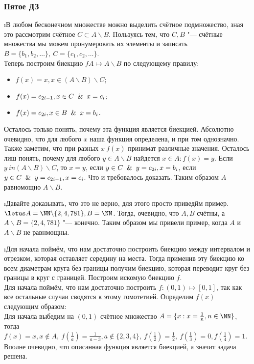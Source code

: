 \subsubsection{Пятое ДЗ}


\i В любом бесконечном множестве можно выделить счётное подмножество, зная это рассмотрим счётное $C \subset A \backslash B$. Пользуясь тем, что $C, B$ "--- счётные множества мы можем пронумеровать их элементы и записать $B = \{b_1, b_2, \ldots \}, \ C = \{c_1, c_2, \ldots \}$.\\
Теперь построим биекцию $f A \mapsto A \backslash B$ по следующему правилу:
\begin{itemize}
    \item $f(x) = x, x \in (A \backslash B) \backslash C$;
    \item $f(x) = c_{2i-1}, x \in C \And x = c_i$;
    \item $f(x) = c_{2i}, x \in B \And x = b_i$.
\end{itemize}
Осталось только понять, почему эта функция является биекцией. Абсолютно очевидно, что для любого $x$ наша функция определена, и при том однозначно. Также заметим, что при разных $x\ f(x)$ принимат различные значения. Осталось лиш понять, почему для любого $y \in A \backslash B$ найдется $x \in A: f(x) = y$. Если $y \ in (A \backslash B) \backslash C$, то $x = y$, если $y \in C \And y = c_{2i}, x = b_i$, если $y \in C \And y = c_{2i-1}, x = c_i$. Что и требовалось доказать. Таким образом $A$ равномощно $A \backslash B$. 

\i Давайте доказывать, что это не верно, для этого просто приведйм пример.\\
$\letus A = \NN \backslash \{2, 4, 781\}, B = \NN$. Тогда, очевидно, что $A, B$ счётны, а $A \backslash B = \{2, 4, 781\}$ "--- конечно. Таким образом мы привели пример, когда $A$ и $A \backslash B$ не равнмощны.

\i Для начала поймём, что нам достаточно построить биекцию между интервалом и отрезком, которая оставляет середину на места. Тогда применив эту биекцию ко всем диаметрам круга без границы получим биекцию, которая переводит круг без границы в круг с границей. Построим искомую биекцию $f$.\\
Для начала поймём, что нам достаточно построить $f: (0, 1) \mapsto [0, 1]$, так как все остальные случаи сводятся к этому гомотетией. Определим $f(x)$ следующим образом:\\
Для начала выбедим на $(0, 1)$ счётное множество $A = \{x: x = \frac{1}{n}, n \in \NN\}$, тогда $f(x) = x, x \notin A,\ f(\frac{1}{a}) = \frac{1}{a-3}, a\notin \{2, 3, 4\},\ f(\frac{1}{2}) = \frac{1}{2},\ f(\frac{1}{3}) = 0, f(\frac{1}{4}) = 1$. Вполне очевидно, что описанная функция является биекцией, а значит задача решена.

